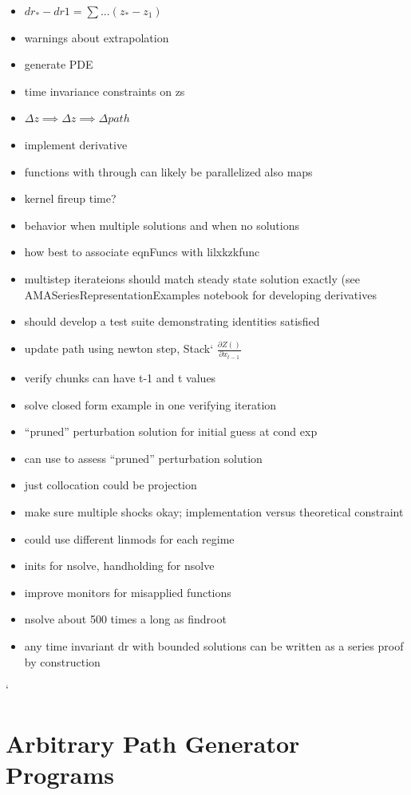 \documentclass[12pt]{article}
\begin{document}
\begin{itemize}
\item $dr_\ast - dr1= \sum ... (z_\ast-z_1)$
\item warnings about extrapolation
\item generate PDE
\item time invariance constraints on zs 
\item $ \Delta z \implies \Delta z \implies \Delta path$
\item implement derivative
\item functions with through can likely be parallelized also maps
\item kernel fireup time?
\item behavior when multiple solutions and when no solutions
\item how best to associate eqnFuncs with lilxkzkfunc 
\item multistep iterateions should match steady state solution exactly (see 
AMASeriesRepresentationExamples notebook for developing derivatives
\item should develop a test suite demonstrating identities satisfied
\item update path using newton step,  Stack` $\frac{\partial Z()}{\partial x_{t-1}}$
\item verify chunks can have t-1 and t  values
\item solve closed form example in one verifying iteration
\item ``pruned'' perturbation solution for initial guess at cond exp
\item can use to assess ``pruned'' perturbation solution
\item just collocation could be projection
\item make sure multiple shocks okay; implementation versus theoretical constraint
\item  could use different linmods for each regime
\item inits for nsolve, handholding for nsolve
\item improve monitors for misapplied functions
\item nsolve about 500 times a long as findroot
\item any time invariant dr with bounded solutions can be written as a series proof by construction
\end{itemize}
`	
\newpage
\appendix

\section{Arbitrary Path Generator Programs}
\label{sec:arbitr-path-gener}
\end{document}
